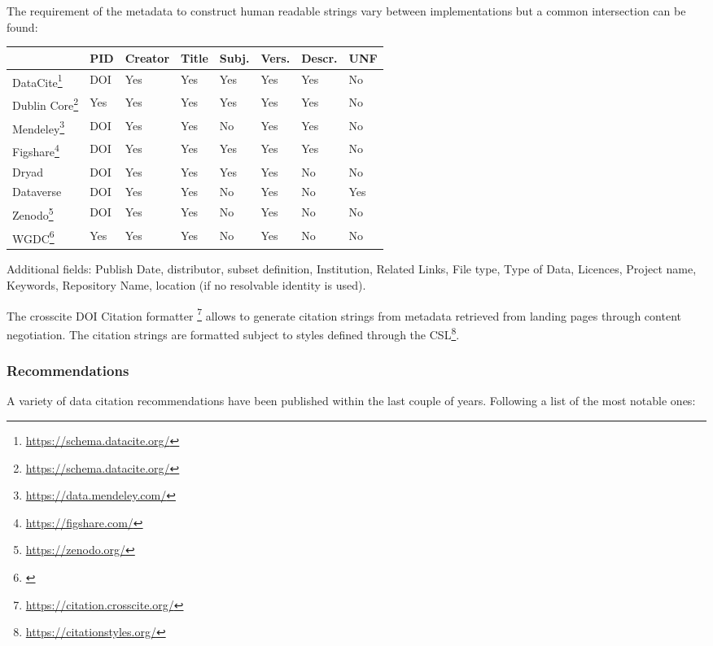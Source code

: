 \documentclass[a4paper,10pt]{article}
\begin{document}
The requirement of the metadata to construct human readable strings vary between implementations but a common intersection can be found:

\begin{tabularx}{\columnwidth}{lll lll ll}
\toprule
                                                          & PID   & Creator & Title & Subj.   & Vers.   & Descr.    & UNF \\ \midrule
DataCite\footnote{\url{https://schema.datacite.org/}}     & DOI   & Yes     & Yes   & Yes     & Yes     & Yes       & No  \\
Dublin Core\footnote{\url{https://schema.datacite.org/}}  & Yes   & Yes     & Yes   & Yes     & Yes     & Yes       & No  \\ 
Mendeley\footnote{\url{https://data.mendeley.com/}}       & DOI   & Yes     & Yes   & No      & Yes     & Yes       & No  \\
Figshare\footnote{\url{https://figshare.com/}}            & DOI   & Yes     & Yes   & Yes     & Yes     & Yes       & No  \\
Dryad                                                     & DOI   & Yes     & Yes   & Yes     & Yes     & No        & No  \\
Dataverse                                                 & DOI   & Yes     & Yes   & No      & Yes     & No        & Yes \\
Zenodo\footnote{\url{https://zenodo.org/}}                & DOI   & Yes     & Yes   & No      & Yes     & No        & No  \\
WGDC\footnote{\citep{Rauber2015}}                         & Yes   & Yes     & Yes   & No      & Yes     & No        & No  \\
\bottomrule
\end{tabularx}


Additional fields: 
Publish Date, distributor, subset definition, Institution, Related Links, File type, Type of Data, Licences, Project name, Keywords, Repository Name, location (if no resolvable identity is used).

The crosscite DOI Citation formatter \footnote{\url{https://citation.crosscite.org/}} allows to generate citation strings from metadata retrieved from landing pages through content negotiation.
The citation strings are formatted subject to styles defined through the \gls{CSL}\footnote{\url{https://citationstyles.org/}}.



\subsubsection{Recommendations}
A variety of data citation recommendations have been published within the last couple of years.
Following a list of the most notable ones:
\end{document}
